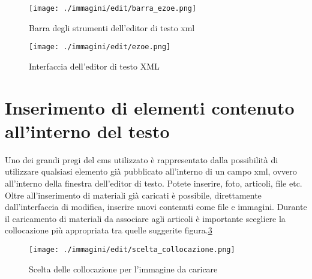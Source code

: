 \begin{figure}[H]
 \centering
 \texttt{[image: ./immagini/edit/barra\_ezoe.png]}
 \caption{Barra degli strumenti dell'editor di testo xml}
 \label{fig:ezoe_barra}
\end{figure}

\begin{figure}[H]
 \centering
 \texttt{[image: ./immagini/edit/ezoe.png]}
 \caption{Interfaccia dell'editor di testo XML}
 \label{fig:ezoe_finestra}
\end{figure}




\section[Embedding contenuti]{Inserimento di elementi contenuto all'interno del testo}

Uno dei grandi pregi del cms utilizzato è rappresentato dalla possibilità di utilizzare qualsiasi elemento già pubblicato all'interno di un campo xml, ovvero all'interno della finestra dell'editor di testo. Potete inserire, foto, articoli, file etc. Oltre all'inserimento di materiali già caricati è possibile, direttamente dall'interfaccia di modifica, inserire nuovi contenuti come file e immagini. Durante il caricamento di materiali da associare agli articoli è importante scegliere la collocazione più appropriata tra quelle suggerite figura.\ref{fig:edit_scelta_collocazione}

\begin{figure}[H]
 \centering
 \texttt{[image: ./immagini/edit/scelta\_collocazione.png]}
 \caption{Scelta delle collocazione per l'immagine da caricare}
 \label{fig:edit_scelta_collocazione}
\end{figure}

